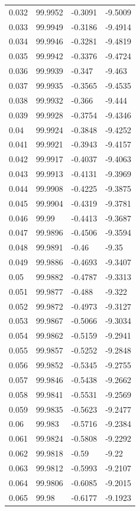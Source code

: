 \begin{tabular}{llll}
0.032 & 99.9952 & -0.3091 & -9.5009 \\
0.033 & 99.9949 & -0.3186 & -9.4914 \\
0.034 & 99.9946 & -0.3281 & -9.4819 \\
0.035 & 99.9942 & -0.3376 & -9.4724 \\
0.036 & 99.9939 & -0.347 & -9.463 \\
0.037 & 99.9935 & -0.3565 & -9.4535 \\
0.038 & 99.9932 & -0.366 & -9.444 \\
0.039 & 99.9928 & -0.3754 & -9.4346 \\
0.04 & 99.9924 & -0.3848 & -9.4252 \\
0.041 & 99.9921 & -0.3943 & -9.4157 \\
0.042 & 99.9917 & -0.4037 & -9.4063 \\
0.043 & 99.9913 & -0.4131 & -9.3969 \\
0.044 & 99.9908 & -0.4225 & -9.3875 \\
0.045 & 99.9904 & -0.4319 & -9.3781 \\
0.046 & 99.99 & -0.4413 & -9.3687 \\
0.047 & 99.9896 & -0.4506 & -9.3594 \\
0.048 & 99.9891 & -0.46 & -9.35 \\
0.049 & 99.9886 & -0.4693 & -9.3407 \\
0.05 & 99.9882 & -0.4787 & -9.3313 \\
0.051 & 99.9877 & -0.488 & -9.322 \\
0.052 & 99.9872 & -0.4973 & -9.3127 \\
0.053 & 99.9867 & -0.5066 & -9.3034 \\
0.054 & 99.9862 & -0.5159 & -9.2941 \\
0.055 & 99.9857 & -0.5252 & -9.2848 \\
0.056 & 99.9852 & -0.5345 & -9.2755 \\
0.057 & 99.9846 & -0.5438 & -9.2662 \\
0.058 & 99.9841 & -0.5531 & -9.2569 \\
0.059 & 99.9835 & -0.5623 & -9.2477 \\
0.06 & 99.983 & -0.5716 & -9.2384 \\
0.061 & 99.9824 & -0.5808 & -9.2292 \\
0.062 & 99.9818 & -0.59 & -9.22 \\
0.063 & 99.9812 & -0.5993 & -9.2107 \\
0.064 & 99.9806 & -0.6085 & -9.2015 \\
0.065 & 99.98 & -0.6177 & -9.1923 \\

\end{tabular}
